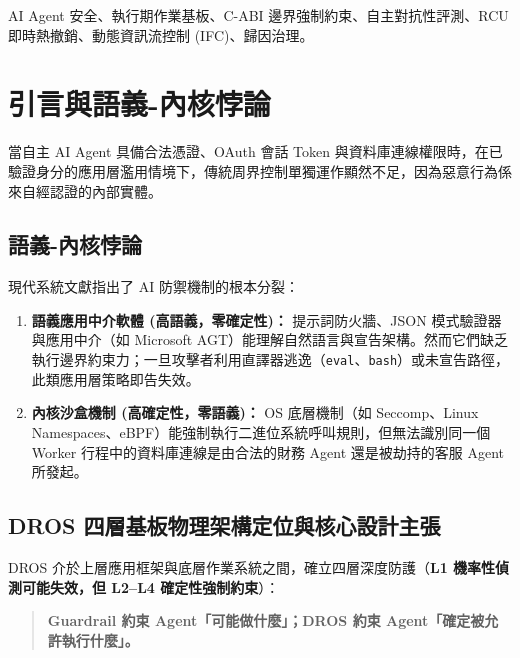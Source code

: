 \documentclass[conference]{IEEEtran}
\begin{document}
\begin{IEEEkeywords}
AI Agent 安全、執行期作業基板、C-ABI 邊界強制約束、自主對抗性評測、RCU 即時熱撤銷、動態資訊流控制 (IFC)、歸因治理。
\end{IEEEkeywords}

\section{引言與語義-內核悖論}
當自主 AI Agent 具備合法憑證、OAuth 會話 Token 與資料庫連線權限時，在已驗證身分的應用層濫用情境下，傳統周界控制單獨運作顯然不足，因為惡意行為係來自經認證的內部實體。

\subsection{語義-內核悖論}
現代系統文獻指出了 AI 防禦機制的根本分裂：
\begin{enumerate}
    \item \textbf{語義應用中介軟體 (高語義，零確定性)：} 提示詞防火牆、JSON 模式驗證器與應用中介（如 Microsoft AGT）能理解自然語言與宣告架構。然而它們缺乏執行邊界約束力；一旦攻擊者利用直譯器逃逸（\texttt{eval}、\texttt{bash}）或未宣告路徑，此類應用層策略即告失效。
    \item \textbf{內核沙盒機制 (高確定性，零語義)：} OS 底層機制（如 Seccomp、Linux Namespaces、eBPF）能強制執行二進位系統呼叫規則，但無法識別同一個 Worker 行程中的資料庫連線是由合法的財務 Agent 還是被劫持的客服 Agent 所發起。
\end{enumerate}

\subsection{DROS 四層基板物理架構定位與核心設計主張}
DROS 介於上層應用框架與底層作業系統之間，確立四層深度防護（\textbf{L1 機率性偵測可能失效，但 L2--L4 確定性強制約束}）：

\begin{quote}
\centering
\textbf{Guardrail 約束 Agent「可能做什麼」；DROS 約束 Agent「確定被允許執行什麼」。}
\end{quote}
\end{document}
